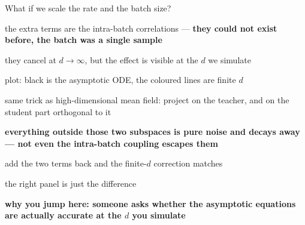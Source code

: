 \documentclass[aspectratio=169,11pt]{beamer}
\begin{document}
\begin{frame}{What if we scale the rate and the batch size?}
{\begin{notelist}
    \item the extra terms are the intra-batch correlations --- \textbf{they could
      not exist before, the batch was a single sample}
    \item they cancel at $d \to \infty$, but the effect is visible at the $d$ we
      simulate
    \item plot: black is the asymptotic ODE, the coloured lines are finite $d$
    \item same trick as high-dimensional mean field: project on the teacher, and on
      the student part orthogonal to it
    \item \textbf{everything outside those two subspaces is pure noise and decays
      away --- not even the intra-batch coupling escapes them}
    \item add the two terms back and the finite-$d$ correction matches
    \item the right panel is just the difference
    \item \textbf{why you jump here: someone asks whether the asymptotic
      equations are actually accurate at the $d$ you simulate}
  \end{notelist}}
\end{frame}
\end{document}
